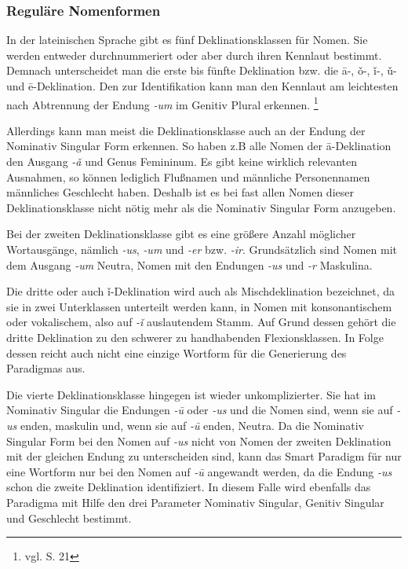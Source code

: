 \subsubsection{Reguläre Nomenformen}
In der lateinischen Sprache gibt es fünf Deklinationsklassen für Nomen. Sie werden entweder durchnummeriert oder aber durch ihren Kennlaut bestimmt. Demnach unterscheidet man die erste bis fünfte Deklination bzw. die ā-, ǒ-, ǐ-, ǔ- und ē-Deklination. Den zur Identifikation kann man den Kennlaut am leichtesten nach Abtrennung der Endung \textit{-um} im Genitiv Plural erkennen. \footnote{vgl. \cite{BAYER-LINDAUER1994} S. 21}\par
Allerdings kann man meist die Deklinationsklasse auch an der Endung der Nominativ Singular Form erkennen. So haben z.B alle Nomen der ā-Deklination den Ausgang \textit{-ǎ} und Genus Femininum. Es gibt keine wirklich relevanten Ausnahmen, so können lediglich Flußnamen und männliche Personennamen männliches Geschlecht haben. Deshalb ist es bei fast allen Nomen dieser Deklinationsklasse nicht nötig mehr als die Nominativ Singular Form anzugeben. \par
Bei der zweiten Deklinationsklasse gibt es eine größere Anzahl möglicher Wortausgänge, nämlich \textit{-us}, \textit{-um} und \textit{-er} bzw. \textit{-ir}. Grundsätzlich sind Nomen mit dem Ausgang \textit{-um} Neutra, Nomen mit den Endungen \textit{-us} und \textit{-r} Maskulina. \par
Die dritte oder auch ǐ-Deklination wird auch als Mischdeklination bezeichnet, da sie in zwei Unterklassen unterteilt werden kann, in Nomen mit konsonantischem oder vokalischem, also auf \textit{-ǐ} auslautendem Stamm. Auf Grund dessen gehört die dritte Deklination zu den schwerer zu handhabenden Flexionsklassen. In Folge dessen reicht auch nicht eine einzige Wortform für die Generierung des Paradigmas aus. \par
Die vierte Deklinationsklasse hingegen ist wieder unkomplizierter. Sie hat im Nominativ Singular die Endungen \textit{-ū} oder \textit{-us} und die Nomen sind, wenn sie auf \textit{-us} enden, maskulin und, wenn sie auf \textit{-ū} enden, Neutra. Da die Nominativ Singular Form bei den Nomen auf \textit{-us} nicht von Nomen der zweiten Deklination mit der gleichen Endung zu unterscheiden sind, kann das Smart Paradigm für nur eine Wortform nur bei den Nomen auf \textit{-ū} angewandt werden, da die Endung \textit{-us} schon die zweite Deklination identifiziert. In diesem Falle wird ebenfalls das Paradigma mit Hilfe den drei Parameter Nominativ Singular, Genitiv Singular und Geschlecht bestimmt. \par
